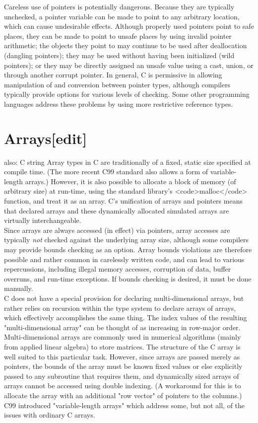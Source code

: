 \documentclass{article}\usepackage{titlesec}
\begin{document}
Careless use of pointers is potentially dangerous.  Because they are typically unchecked, a pointer variable can be made to point to any arbitrary location, which can cause undesirable effects.  Although properly used pointers point to safe places, they can be made to point to unsafe places by using invalid pointer arithmetic; the objects they point to may continue to be used after deallocation (dangling pointers); they may be used without having been initialized (wild pointers); or they may be directly assigned an unsafe value using a cast, union, or through another corrupt pointer.  In general, C is permissive in allowing manipulation of and conversion between pointer types, although compilers typically provide options for various levels of checking. Some other programming languages address these problems by using more restrictive reference types.
\\

\section{Arrays[edit]}
\itemSee also: C string
Array types in C are traditionally of a fixed, static size specified at compile time.  (The more recent C99 standard also allows a form of variable-length arrays.)  However, it is also possible to allocate a block of memory (of arbitrary size) at run-time, using the standard library's <code>malloc</code> function, and treat it as an array.  C's unification of arrays and pointers means that declared arrays and these dynamically allocated simulated arrays are virtually interchangeable.
\\
Since arrays are always accessed (in effect) via pointers, array accesses are typically \emph{not} checked against the underlying array size, although some compilers may provide bounds checking as an option.  Array bounds violations are therefore possible and rather common in carelessly written code, and can lead to various repercussions, including illegal memory accesses, corruption of data, buffer overruns, and run-time exceptions.  If bounds checking is desired, it must be done manually.
\\
C does not have a special provision for declaring multi-dimensional arrays, but rather relies on recursion within the type system to declare arrays of arrays, which effectively accomplishes the same thing.  The index values of the resulting "multi-dimensional array" can be thought of as increasing in row-major order.
\\
Multi-dimensional arrays are commonly used in numerical algorithms (mainly from applied linear algebra) to store matrices. The structure of the C array is well suited to this particular task. However, since arrays are passed merely as pointers, the bounds of the array must be known fixed values or else explicitly passed to any subroutine that requires them, and dynamically sized arrays of arrays cannot be accessed using double indexing. (A workaround for this is to allocate the array with an additional "row vector" of pointers to the columns.)
\\
C99 introduced "variable-length arrays" which address some, but not all, of the issues with ordinary C arrays.
\\
\end{document}
